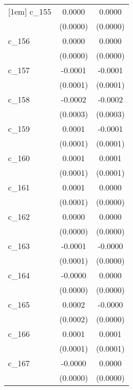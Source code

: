 {\begin{tabular}{l*{2}{c}}
[1em]
c\_155       &      0.0000        &      0.0000        \\
            &    (0.0000)        &    (0.0000)        \\
[1em]
c\_156       &      0.0000        &      0.0000        \\
            &    (0.0000)        &    (0.0000)        \\
[1em]
c\_157       &     -0.0001        &     -0.0001        \\
            &    (0.0001)        &    (0.0001)        \\
[1em]
c\_158       &     -0.0002        &     -0.0002        \\
            &    (0.0003)        &    (0.0003)        \\
[1em]
c\_159       &      0.0001        &     -0.0001        \\
            &    (0.0001)        &    (0.0001)        \\
[1em]
c\_160       &      0.0001        &      0.0001        \\
            &    (0.0001)        &    (0.0001)        \\
[1em]
c\_161       &      0.0001        &      0.0000        \\
            &    (0.0001)        &    (0.0000)        \\
[1em]
c\_162       &      0.0000        &      0.0000        \\
            &    (0.0000)        &    (0.0000)        \\
[1em]
c\_163       &     -0.0001        &     -0.0000        \\
            &    (0.0001)        &    (0.0000)        \\
[1em]
c\_164       &     -0.0000        &      0.0000        \\
            &    (0.0000)        &    (0.0000)        \\
[1em]
c\_165       &      0.0002        &     -0.0000        \\
            &    (0.0002)        &    (0.0000)        \\
[1em]
c\_166       &      0.0001        &      0.0001        \\
            &    (0.0001)        &    (0.0001)        \\
[1em]
c\_167       &     -0.0000        &      0.0000        \\
            &    (0.0000)        &    (0.0000)        \\

\end{tabular}}
